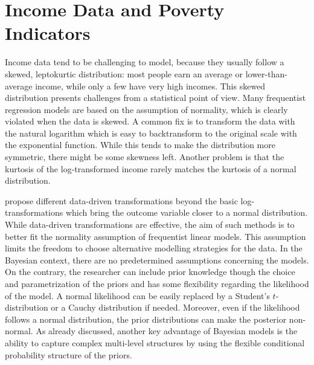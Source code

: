 \section{Income Data and Poverty Indicators}
Income data tend to be challenging to model, because they usually follow a skewed, leptokurtic distribution: most people earn an average or lower-than-average income, while only a few have very high incomes. This skewed distribution presents challenges from a statistical point of view. Many frequentist regression models are based on the assumption of normality, which is clearly violated when the data is skewed. 
A common fix is to transform the data with the natural logarithm which is easy to backtransform to the original scale with the exponential function. While this tends to make the distribution more symmetric, there might be some skewness left. Another problem is that the kurtosis of the log-transformed income rarely matches the kurtosis of a normal distribution. 

\cite{rojas_perilla_data_2020} propose different data-driven transformations beyond the basic log-transformations which bring the outcome variable closer to a normal distribution. While data-driven transformations are effective, the aim of such methods is to better fit the normality assumption of frequentist linear models. This assumption limits the freedom to choose alternative modelling strategies for the data. In the Bayesian context, there are no predetermined assumptions concerning the models. On the contrary, the researcher can include prior knowledge though the choice and parametrization of the priors and has some flexibility regarding the likelihood of the model. A normal likelihood can be easily replaced by a Student's $t$-distribution or a Cauchy distribution if needed. Moreover, even if the likelihood follows a normal distribution, the prior distributions can make the posterior non-normal. As already discussed, another key advantage of Bayesian models is the ability to capture complex multi-level structures by using the flexible conditional probability structure of the priors.


